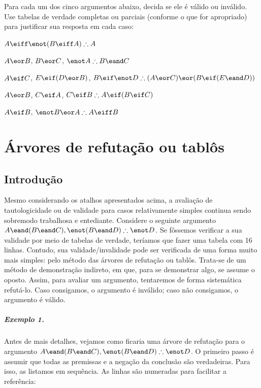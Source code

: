 \noindent\problempart Para cada um dos cinco argumentos abaixo, decida se ele é válido ou inválido.
Use tabelas de verdade completas ou parciais (conforme o que for apropriado) para justificar sua resposta em cada caso:
\label{pr.TT.valid6} 
\begin{earg}
\item $A\eiff\enot(B\eiff A)\therefore A$ %
\item $A\eor B$, $B\eor C$, $\enot A\therefore B \eand C$ %
\item $A \eif C$, $E \eif (D \eor B)$, $B \eif \enot D\therefore (A \eor C) \eor (B \eif (E \eand D))$ %
\item $A \eor B$, $C \eif A$, $C \eif B\therefore A \eif (B \eif C)$ %
\item $A \eif B$, $\enot B \eor A\therefore A \eiff B$ %
\end{earg}



\chapter{Árvores de refutação ou tablôs}\label{s:TruthTrees}


\section{Introdução}

Mesmo considerando os atalhos apresentados acima, a avaliação de tautologicidade ou de validade  para casos relativamente simples continua sendo sobremodo trabalhosa e entediante.
Considere o seguinte argumento  $A \eand (B \eand C), \enot(B \eand D) \therefore \enot D$. 
Se fôssemos verificar a sua validade por meio de tabelas de verdade, teríamos que fazer uma tabela com 16 linhas. 
Contudo, sua validade/invalidade pode ser verificada de uma forma muito mais simples: pelo método das árvores de refutação ou tablôs. 
Trata-se de um método de demonstração indireto, em que, para se demonstrar algo, se assume o oposto.
Assim, para avaliar um argumento, tentaremos de forma sistemática refutá-lo.
Caso consigamos, o argumento é inválido; caso não consigamos, o argumento é válido. 

\paragraph{Exemplo 1.}

Antes de mais detalhes, vejamos como ficaria uma árvore de refutação para o argumento  $A \eand (B \eand C), \enot(B \eand D) \therefore \enot D$.
O primeiro passo é assumir que todas as premissas e a negação da conclusão são verdadeiras. 
Para isso, as listamos em sequência.
As linhas são numeradas para facilitar a referência:

